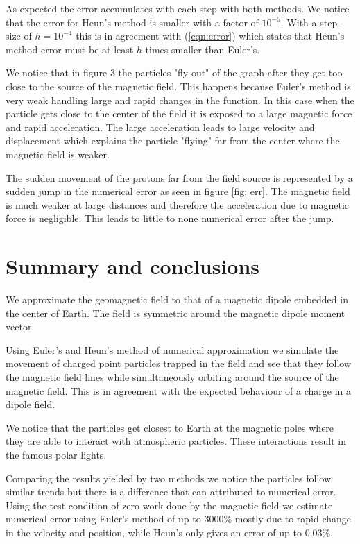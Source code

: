 \documentclass[final,5p,times,twocolumn,authoryear]{elsarticle}
\begin{document}
As expected the error accumulates with each step with both methods. We notice that the error for Heun's method is smaller with a factor of $10^{-5}$. With a step-size of $h=10^{-4}$ this is in agreement with (\ref{eqn:error}) which states that Heun's method error must be at least $h$ times smaller than Euler's. 

We notice that in figure 3 the particles "fly out" of the graph after they get too close to the source of the magnetic field. This happens because Euler's method is very weak handling large and rapid changes in the function. In this case when the particle gets close to the center of the field it is exposed to a large magnetic force and rapid acceleration. The large acceleration leads to large velocity and displacement which explains the particle "flying" far from the center where the magnetic field is weaker.

The sudden movement of the protons far from the field source is represented by a sudden jump in the numerical error as seen in figure \ref{fig: err}. The magnetic field is much weaker at large distances and therefore the acceleration due to magnetic force is negligible. This leads to little to none numerical error after the jump.

\section{Summary and conclusions}
\label{summary}
We approximate the geomagnetic field to that of a magnetic dipole embedded in the center of Earth. The field is symmetric around the magnetic dipole moment vector.

Using Euler's and Heun's method of numerical approximation we simulate the movement of charged point particles trapped in the field and see that they follow the magnetic field lines while simultaneously orbiting around the source of the magnetic field. This is in agreement with the expected behaviour of a charge in a dipole field.

We notice that the particles get closest to Earth at the magnetic poles where they are able to interact with atmospheric particles. These interactions result in the famous polar lights.

Comparing the results yielded by two methods we notice the particles follow similar trends but there is a difference that can attributed to numerical error. Using the test condition of zero work done by the magnetic field we estimate numerical error using Euler's method of up to 3000\% mostly due to rapid change in the velocity and position, while Heun's only gives an error of up to 0.03\%. 
\end{document}
